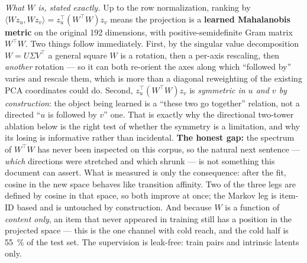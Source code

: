 \documentclass[11pt]{article}
\begin{document}
\emph{What $W$ is, stated exactly.} Up to the row normalization, ranking by
$\langle Wz_u, Wz_v\rangle = z_u^{\top}(W^{\top}W)z_v$ means the projection is a
\textbf{learned Mahalanobis metric} on the original \num{192} dimensions, with
positive-semidefinite Gram matrix $W^{\top}W$. Two things follow immediately.
First, by the singular value decomposition $W=U\Sigma V^{\top}$ a general square
$W$ is a rotation, then a per-axis rescaling, then \emph{another} rotation --- so
it can both re-orient the axes along which ``followed by'' varies and rescale
them, which is more than a diagonal reweighting of the existing PCA coordinates
could do. Second, $z_u^{\top}(W^{\top}W)z_v$ is \emph{symmetric in $u$ and $v$ by
construction}: the object being learned is a ``these two go together'' relation,
not a directed ``$u$ is followed by $v$'' one. That is exactly why the directional
two-tower ablation below is the right test of whether the symmetry is a
limitation, and why its losing is informative rather than incidental.
\textbf{The honest gap:} the spectrum of $W^{\top}W$ has never been inspected on
this corpus, so the natural next sentence --- \emph{which} directions were
stretched and which shrunk --- is not something this document can assert. What is
measured is only the consequence: after the fit, cosine in the new space behaves
like transition affinity. Two of the three legs are defined by cosine in that
space, so both improve at once; the Markov leg is item-ID based and is untouched
by construction. And because $W$ is a function of \emph{content
only}, an item that never appeared in training still has a position in the
projected space --- this is the one channel with cold reach, and the cold half is
\SI{55}{\percent} of the test set. The supervision is leak-free: train pairs and
intrinsic latents only.
\end{document}
